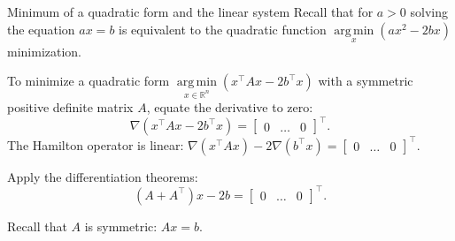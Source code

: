 \documentclass[UKenglish,aspectratio=169]{beamer}
\DeclareMathOperator*{\argmin}{arg\,min}
\begin{document}
\begin{frame}{Minimum of a quadratic form and the linear system}
Recall that for $a>0$ solving the equation $ax=b$ is equivalent to the quadratic function $\argmin\limits_x(ax^2 - 2bx)$ minimization.
\pause

To minimize a quadratic form $\argmin\limits_{x\in\mathbb R^n} (x^\top A x - 2b^\top x)$ with  a symmetric positive definite matrix $A$,
equate the derivative to zero: $$\nabla (x^\top A x - 2b^\top x) = \begin{bmatrix}0 & \dots & 0 \end{bmatrix}^\top.$$
\pause
The Hamilton operator is linear: $\nabla (x^\top A x) - 2\nabla(b^\top x) = \begin{bmatrix}0 & \dots & 0 \end{bmatrix}^\top$.

\pause
Apply the differentiation theorems:
$$(A+A^\top)x - 2b = \begin{bmatrix}0 & \dots & 0 \end{bmatrix}^\top.$$

\pause
Recall that $A$ is symmetric: $Ax = b.$
\end{frame}
\end{document}
